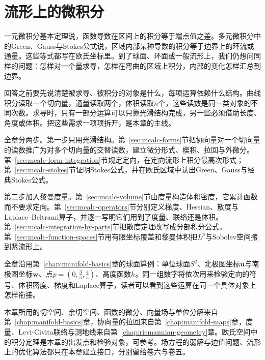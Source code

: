 \chapter{流形上的微积分}
\label{chap:manifold-calculus}

一元微积分基本定理说，函数导数在区间上的积分等于端点值之差。多元微积分中的Green、Gauss与Stokes公式说，区域内部某种导数的积分等于边界上的环流或通量。这些等式都写在欧氏坐标里。到了球面、环面或一般流形上，我们仍想问同样的问题：怎样对一个量求导，怎样在弯曲的区域上积分，内部的变化怎样汇总到边界。

回答之前要先说清楚被求导、被积分的对象是什么，每项运算依赖什么结构。曲线积分读取一个切向量，通量读取两个，体积读取$n$个，这些读数是同一类对象的不同次数。求导时，只有一部分运算可以只靠光滑结构完成，另一些必须借助长度、角度或体积。把这些需求一项项拆开，是本章的主线。

全章分两步。第一步只用光滑结构。第~\ref{sec:mcalc-forms}节把协向量对一个切向量的读数推广为对多个切向量的交替读数，建立微分形式、楔积、拉回与外微分。第~\ref{sec:mcalc-form-integration}节规定定向，在定向流形上积分最高次形式；第~\ref{sec:mcalc-stokes}节证明Stokes公式，并在欧氏区域中认出Green、Gauss与经典Stokes公式。

第二步加入黎曼度量。第~\ref{sec:mcalc-volume}节由度量构造体积密度，它累计函数而不要求定向。第~\ref{sec:mcalc-operators}节分别定义梯度、Hessian、散度与Laplace--Beltrami算子，并逐一写明它们用到了度量、联络还是体积。第~\ref{sec:mcalc-integration-by-parts}节把散度定理改写成分部积分公式，第~\ref{sec:mcalc-function-spaces}节用有限坐标覆盖和黎曼体积把$L^p$与Sobolev空间搬到紧流形上。

全章沿用第~\ref{chap:manifold-basics}章的球面算例：单位球面$S^2$、北极图坐标$\bm u$与南极图坐标$\bm w$、点$p=(0,\tfrac35,\tfrac45)$、高度函数$h$。同一组数字将依次用来检验定向的符号、体积密度、梯度和Laplace算子，读者可以看到这些运算在同一个具体对象上怎样衔接。

本章所用的切空间、余切空间、函数的微分、向量场与单位分解来自第~\ref{chap:manifold-basics}章，协向量的拉回来自第~\ref{chap:manifold-maps}章，度量、Levi-Civita联络与测地线来自第~\ref{chap:riemannian-geometry}章。欧氏空间中的积分定理是本章的出发点和检验对象，可参考。场方程的弱解与边值问题、流形上的优化算法都只在本章建立接口，分别留给卷六与卷五。









